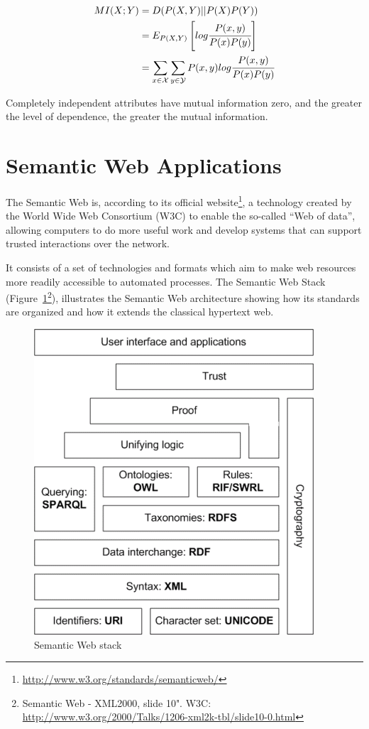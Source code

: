 \begin{equation} \label{eq:mutualInformation}
\begin{split}
 MI(X;Y)&=D(P(X,Y)||P(X)P(Y)) \\
 &=E_{P(X,Y)}\left[ log\cfrac{P(x,y)}{P(x)P(y)} \right] \\
 &=\sum_{x \in \mathcal{X}} \sum_{y \in \mathcal{Y}} P(x,y)log\cfrac{P(x,y)}{P(x)P(y)}
\end{split}
\end{equation}

Completely independent attributes have mutual information zero, and the greater the level of dependence, the greater
the mutual information.

\section{Semantic Web Applications}
\label{sec:rw-semanticWeb}

The Semantic Web is, according to its official website\footnote{\url{http://www.w3.org/standards/semanticweb/}}, a
technology created by the World Wide Web Consortium (W3C) to enable the so-called ``Web of data'', allowing computers
to do more useful work and develop systems that can support trusted interactions over the network. 

It consists of a set of technologies and formats which aim to make web resources more readily accessible to automated
processes. The Semantic Web Stack (Figure~\ref{fig:sematicWebLayer}\footnote{Semantic Web - XML2000, slide 10".
W3C: \url{http://www.w3.org/2000/Talks/1206-xml2k-tbl/slide10-0.html}}), illustrates the Semantic Web architecture
showing how its standards are organized and how it extends the classical hypertext web.

\begin{figure}
\begin{center}
  \includegraphics[width=0.5\linewidth]{./Figures/Semantic-web-stack.png}
\end{center}
\caption{Semantic Web stack}
\label{fig:sematicWebLayer}
\end{figure}

